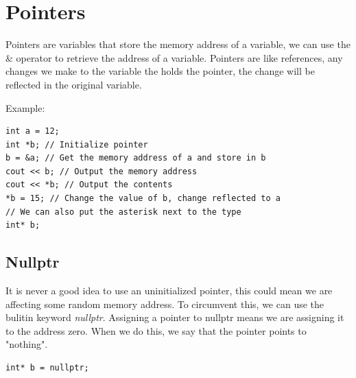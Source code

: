 \documentclass{report}
\begin{document}
    \pagebreak \bigbreak \noindent 
    \section{\LARGE Pointers}
    \bigbreak \noindent 
    \begin{concept}
 Pointers are variables that store the memory address of a variable, we can use the \& operator to retrieve the address of a variable. Pointers are like references, any changes we make to the variable the holds the pointer, the change will be reflected in the original variable.
	\end{concept}
    \bigbreak \noindent 
    \bigbreak \noindent 
    Example:
    \bigbreak \noindent 
    \sepline
    \begin{verbatim}
int a = 12;
int *b; // Initialize pointer  
b = &a; // Get the memory address of a and store in b
cout << b; // Output the memory address
cout << *b; // Output the contents
*b = 15; // Change the value of b, change reflected to a
// We can also put the asterisk next to the type
int* b;
    \end{verbatim}
    \sepline

    \bigbreak \noindent 
    \subsection{Nullptr}
    \bigbreak \noindent 
    It is never a good idea to use an uninitialized pointer, this could mean we are affecting some random memory address. To circumvent this, we can use the bulitin keyword \textit{nullptr}. Assigning a pointer to nullptr means we are assigning it to the address zero. When we do this, we say that the pointer points to "nothing".
    \bigbreak \noindent 
    \sepline
    \begin{verbatim}
int* b = nullptr;
    \end{verbatim}
    \sepline
    \bigbreak \noindent 

    \pagebreak\bigbreak \noindent 
\end{document}
